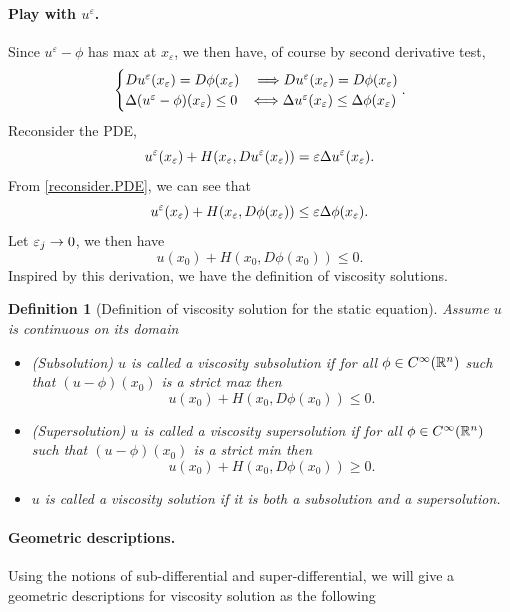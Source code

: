 \documentclass[12pt, oneside]{amsart}  	%
\newtheorem{definition}{Definition}
\begin{document}
\paragraph{\textbf{Play with $u^\varepsilon$.}} Since $u^\varepsilon -\phi$ has max at $x_\varepsilon$, we then have, of course by second derivative test,
\begin{equation}\label{reconsider.PDE}
\begin{cases}
	Du^\varepsilon(x_\varepsilon)=D\phi(x_\varepsilon) &\;\Longrightarrow Du^\varepsilon(x_\varepsilon) = D\phi(x_\varepsilon) \\
	\Delta(u^\varepsilon - \phi)(x_\varepsilon)\le 0 &\Longleftrightarrow \Delta u^\varepsilon(x_\varepsilon)\le \Delta\phi(x_\varepsilon)
\end{cases}.
\end{equation}
Reconsider the PDE,
\begin{equation*}
u^\varepsilon(x_\varepsilon) + H(x_\varepsilon, Du^\varepsilon(x_\varepsilon))=\varepsilon \Delta u^\varepsilon(x_\varepsilon).
\end{equation*}
From \eqref{reconsider.PDE}, we can see that
\begin{equation*}
u^\varepsilon(x_\varepsilon) + H(x_\varepsilon, D\phi(x_\varepsilon))\le \varepsilon \Delta\phi(x_\varepsilon).
\end{equation*}
Let $\varepsilon_j\to 0$, we then have
\begin{equation*}
u(x_0)+ H(x_0, D\phi(x_0))\le 0.
\end{equation*}
Inspired by this derivation, we have the definition of viscosity solutions.

\begin{definition} [Definition of viscosity solution for the static equation] Assume $u$ is continuous on its domain
\begin{itemize}
\item (Subsolution) $u$ is called a viscosity subsolution if for all $\phi\in C^\infty(\mathbb{R}^n)$ such that $(u-\phi)(x_0)$ is a strict max then
$$u(x_0) + H(x_0, D\phi(x_0))\le 0.$$
\item (Supersolution) $u$ is called a viscosity supersolution if for all $\phi\in C^\infty(\mathbb{R}^n)$ such that $(u-\phi)(x_0)$ is a strict min then
$$u(x_0) + H(x_0, D\phi(x_0))\ge 0.$$
\item $u$ is called a viscosity solution if it is both a subsolution and a supersolution.
\end{itemize}
\end{definition}

\paragraph{\textbf{Geometric descriptions.}} Using the notions of sub-differential and super-differential, we will give a geometric descriptions for viscosity solution as the following
\end{document}
